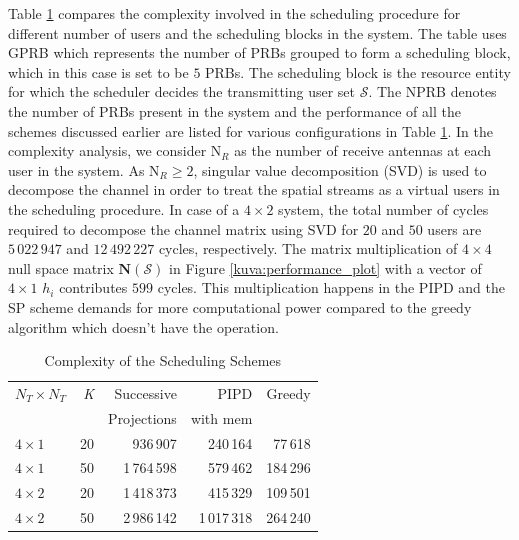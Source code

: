 \documentclass[conference]{./../../IEEE/IEEEtran}
\begin{document}
Table \ref{table:compexity_comparison} compares the complexity involved in the scheduling procedure for different number of users and the scheduling blocks in the system. The table uses GPRB which represents the number of PRBs grouped to form a scheduling block, which in this case is set to be $5$ PRBs. The scheduling block is the resource entity for which the scheduler decides the transmitting user set $\mathcal{S}$. The NPRB denotes the number of PRBs present in the system and the performance of all the schemes discussed earlier are listed for various configurations in Table \ref{table:compexity_comparison}. In the complexity analysis, we consider $\textrm{N}_R$ as the number of receive antennas at each user in the system. As $\textrm{N}_R \geq 2$, singular value decomposition (SVD) is used to decompose the channel in order to treat the spatial streams as a virtual users in the scheduling procedure. In case of a $4 \times 2$ system, the total number of cycles required to decompose the channel matrix using SVD for $20$ and $50$ users are $5 \, 022 \, 947$ and $12 \, 492 \, 227$ cycles, respectively. The matrix multiplication of $4 \times 4$ null space matrix $\textbf{N}(\mathcal{S})$ in Figure \ref{kuva:performance_plot} with a vector of $4 \times 1$ $h_i$ contributes $599$ cycles. This multiplication happens in the PIPD and the SP scheme demands for more computational power compared to the greedy algorithm which doesn't have the operation.


\begin{table}[ht!]\caption{Complexity of the Scheduling Schemes} \vspace{-3ex}\begin{center} \small
\begin{tabular}{l r r r r}
$\textit{N}_T \times \textit{N}_T$ & \textit{K} & Successive     & PIPD          & Greedy \\
                                   &            & Projections    & with mem      &        \\ \hline
$4 \times 1$                       & 20         & 936\,907       & 240\,164      & 77\,618  \\
$4 \times 1$                       & 50         & 1\,764\,598    & 579\,462      & 184\,296 	\\
$4 \times 2$                       & 20         & 1\,418\,373	 & 415\,329      & 109\,501   \\
$4 \times 2$                       & 50         & 2\,986\,142    & 1\,017\,318   & 264\,240 	\\ \hline
\end{tabular} \label{table:compexity_comparison}\end{center}\end{table}
\end{document}
